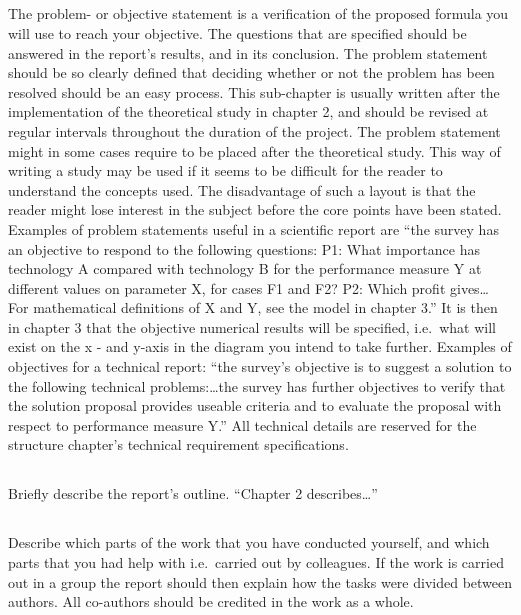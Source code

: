 \subsection{}\label{subsec:goals}
\noindent
The problem- or objective statement is a verification of the proposed formula
you will use to reach your objective. The questions that are specified should be
answered in the report's results, and in its conclusion. The problem statement
should be so clearly defined that deciding whether or not the problem has been
resolved should be an easy process. This sub-chapter is usually written after
the implementation of the theoretical
study in chapter 2, and should be revised at regular intervals throughout the
duration of the project. The problem statement might in some cases require to be
placed after the theoretical study. This way of writing a study may be used if
it seems to be difficult for the reader to understand the concepts used. The
disadvantage of such a layout is that the reader might lose interest in the
subject before the core points have been stated. Examples of problem statements
useful in a scientific report are ``the survey has
an objective to respond to the following questions: P1: What importance has
technology A compared with technology B for the performance measure Y at
different values on parameter X, for cases F1 and F2? P2: Which profit gives…
For mathematical definitions of X and Y, see the model in chapter 3.'' It is then
in chapter 3 that the objective numerical results will be specified, i.e.\ what
will exist on the x - and y-axis in the diagram you intend to take further.
Examples of objectives for a technical report: ``the survey's objective is to
suggest a solution to the following technical problems:\dots the survey has
further objectives to verify that the solution proposal provides useable
criteria and to evaluate the proposal with respect to performance measure Y.''
All technical details are reserved for the structure chapter's technical
requirement specifications.

\subsection{}\label{subsec:outline}
\noindent
Briefly describe the report's outline. ``Chapter 2 describes\dots''

\subsection{}\label{subsec:contributions}
\noindent 
Describe which parts of the work that you have conducted yourself, and which
parts that you had help with i.e.\ carried out by colleagues. If the work is
carried out in a group the report should then explain how the tasks were divided
between authors. All co-authors should be credited in the work as a whole.
